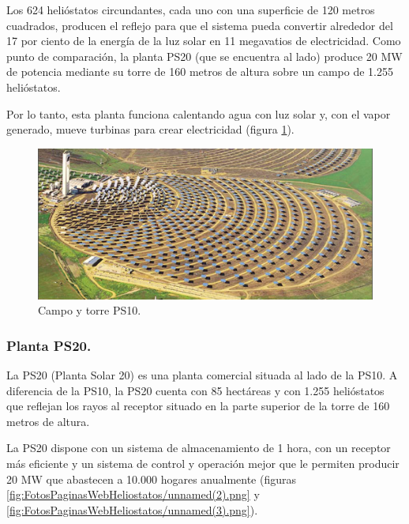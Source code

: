 Los 624 helióstatos circundantes, cada uno con una superficie de 120 metros cuadrados, producen el reflejo para que el sistema pueda convertir alrededor del 17 por ciento de la energía de la luz solar en 11 megavatios de electricidad. Como punto de comparación, la planta PS20 (que se encuentra al lado) produce 20 MW de potencia mediante su torre de 160 metros de altura sobre un campo de 1.255 helióstatos.

Por lo tanto, esta planta funciona calentando agua con luz solar y, con el vapor generado, mueve turbinas para crear electricidad (figura \ref{fig:FotosPaginasWebHeliostatos/unnamed(6).jpg}).

\begin{figure}[h!]
  	\centering
	\includegraphics[width=\textwidth]{FotosPaginasWebHeliostatos/unnamed(6).jpg}
	\caption{Campo y torre PS10.
	\label{fig:FotosPaginasWebHeliostatos/unnamed(6).jpg}}
\end{figure}

\cite{JonathanWebSite}



\subsubsection{Planta PS20.}

La PS20 (Planta Solar 20) es una planta comercial situada al lado de la PS10.
A diferencia de la PS10, la PS20 cuenta con 85 hectáreas y con 1.255 helióstatos que reflejan los rayos al receptor situado en la parte superior de la torre de 160 metros de altura.

La PS20 dispone con un sistema de almacenamiento de 1 hora, con un receptor más eficiente y un sistema de control y operación mejor que le permiten producir 20 MW que abastecen a 10.000 hogares anualmente (figuras \ref{fig:FotosPaginasWebHeliostatos/unnamed(2).png} y \ref{fig:FotosPaginasWebHeliostatos/unnamed(3).png}).

